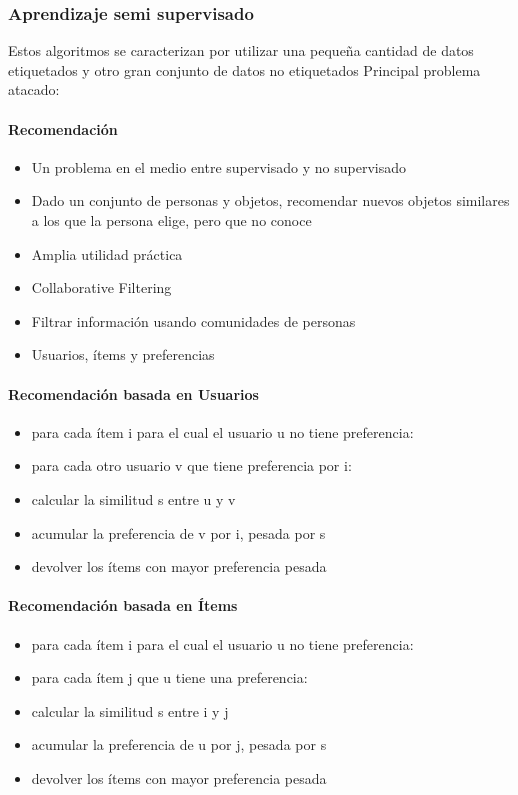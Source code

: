 \documentclass[a4paper,10pt]{article}
\begin{document}
    \subsubsection{Aprendizaje semi supervisado}

      Estos algoritmos se caracterizan por utilizar una pequeña cantidad de datos etiquetados y otro gran conjunto de datos no etiquetados
      Principal problema atacado:
      \paragraph {Recomendación}
	\begin{itemize}
	  \item Un problema en el medio entre supervisado y no supervisado
	  \item Dado un conjunto de personas y objetos, recomendar nuevos objetos similares a los que la persona elige, pero que no conoce
	  \item Amplia utilidad práctica
	  \item Collaborative Filtering
	  \item Filtrar información usando comunidades de personas
	  \item Usuarios, ítems y preferencias
	\end{itemize}
      \paragraph {Recomendación basada en Usuarios}
	\begin{itemize}
	  \item para cada ítem i para el cual el usuario u no tiene preferencia:
	  \item para cada otro usuario v que tiene preferencia por i:
	  \item calcular la similitud s entre u y v
	  \item acumular la preferencia de v por i, pesada por s
	  \item devolver los ítems con mayor preferencia pesada
	\end{itemize}
      \paragraph {Recomendación basada en Ítems}
	\begin{itemize}
	  \item para cada ítem i para el cual el usuario u no tiene preferencia:
	  \item para cada ítem j que u tiene una preferencia:
	  \item calcular la similitud s entre i y j
	  \item acumular la preferencia de u por j, pesada por s
	  \item devolver los ítems con mayor preferencia pesada
	\end{itemize}
\end{document}
